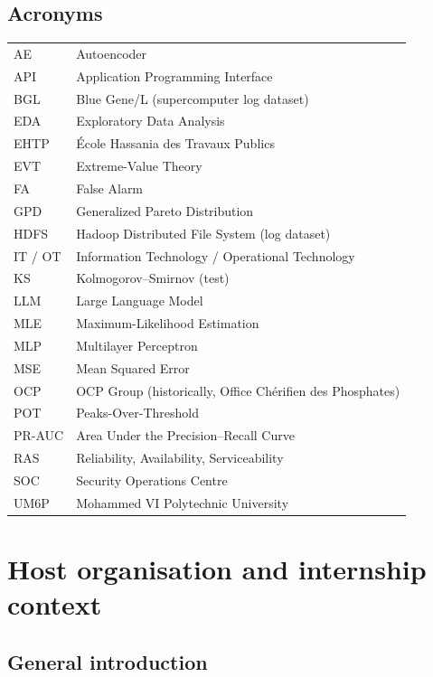 \documentclass[11pt,a4paper]{report}
\begin{document}
\chapter*{Acronyms}
\begin{tabular}{@{}ll@{}}
AE & Autoencoder\\
API & Application Programming Interface\\
BGL & Blue Gene/L (supercomputer log dataset)\\
EDA & Exploratory Data Analysis\\
EHTP & \'Ecole Hassania des Travaux Publics\\
EVT & Extreme-Value Theory\\
FA & False Alarm\\
GPD & Generalized Pareto Distribution\\
HDFS & Hadoop Distributed File System (log dataset)\\
IT / OT & Information Technology / Operational Technology\\
KS & Kolmogorov--Smirnov (test)\\
LLM & Large Language Model\\
MLE & Maximum-Likelihood Estimation\\
MLP & Multilayer Perceptron\\
MSE & Mean Squared Error\\
OCP & OCP Group (historically, Office Ch\'erifien des Phosphates)\\
POT & Peaks-Over-Threshold\\
PR-AUC & Area Under the Precision--Recall Curve\\
RAS & Reliability, Availability, Serviceability\\
SOC & Security Operations Centre\\
UM6P & Mohammed VI Polytechnic University\\
\end{tabular}

\part{Host organisation and internship context}

\chapter{General introduction}
\label{ch:intro}
\end{document}
